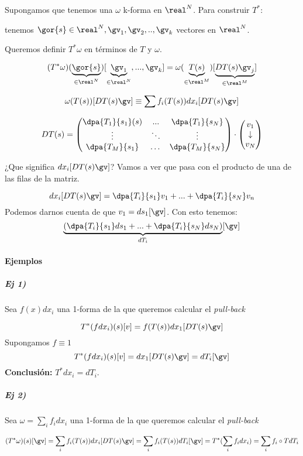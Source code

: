 Supongamos que tenemos una $\omega$ k-forma en $\real^N$.
Para construir $T^{\ast}$:

tenemos $\gor{s} \in \real^N, \gv_1,\gv_2,..,\gv_k$ vectores en $\real^N$.

Queremos definir $T^{\ast}\omega$ en términos de $T$ y $\omega$.

\[
(T^{\ast}\omega)(\underbrace{\gor{s}}_{\in\real^N}) [\underbrace{\gv_1}_{\in\real^N},...,\gv_k] = \omega(\underbrace{T(s)}_{\in\real^M}) [\underbrace{DT(s)\gv_j}_{\in\real^M}]
\]

\obs


\[\omega(T(s)) [DT(s)\gv]\equiv \sum f_i(T(s))dx_i[DT(s)\gv]\]

\[DT(s) = \begin{pmatrix}
\dpa{T_1}{s_1}(s) & ... & \dpa{T_1}{s_N}\\
\vdots & \ddots & \vdots \\
\dpa{T_M}{s_1} & \dots & \dpa{T_M}{s_N}
\end{pmatrix} \cdot \begin{pmatrix}
v_1\\
\downarrow\\
v_N
\end{pmatrix}\]

¿Que significa $dx_i[DT(s)\gv]$? Vamos a ver que pasa con el producto de una de las filas de la matriz.

\[dx_i[DT(s)\gv] = \dpa{T_i}{s_1}v_1 + ... + \dpa{T_i}{s_N}v_n\]
Podemos darnos cuenta de que $v_1 = ds_1[\gv]$. Con esto tenemos:
\[\underbrace{\left(\dpa{T_i}{s_1}ds_1 + ... + \dpa{T_i}{s_N}ds_N \right)}_{dT_i}[\gv]\]


\paragraph{Ejemplos}

\subparagraph{Ej 1)} Sea  $f(x)dx_i$ una 1-forma de la que queremos calcular el \emph{pull-back}

\[T^{\ast}(fdx_i)(s)[v] = f(T(s)) dx_1[DT(s)\gv]\]
Supongamos $f\equiv 1$
\[T^{\ast}(fdx_i)(s)[v] = dx_1[DT(s)\gv] = dT_i[\gv]\]
\textbf{Conclusión: } $T^{\ast}dx_i = dT_i$.

\subparagraph{Ej 2)} Sea $\omega = \sum_i f_i dx_i$ una 1-forma de la que queremos calcular el \emph{pull-back}

\[ 
 (T^{\ast} \omega )(s)[\gv]= \sum_i f_i(T(s))dx_i [DT(s)\gv] = \sum_if_i(T(s)) dT_i[\gv] = T^{\ast} (\sum_i f_idx_i) = \sum_i f_i \circ T dT_i
\]

